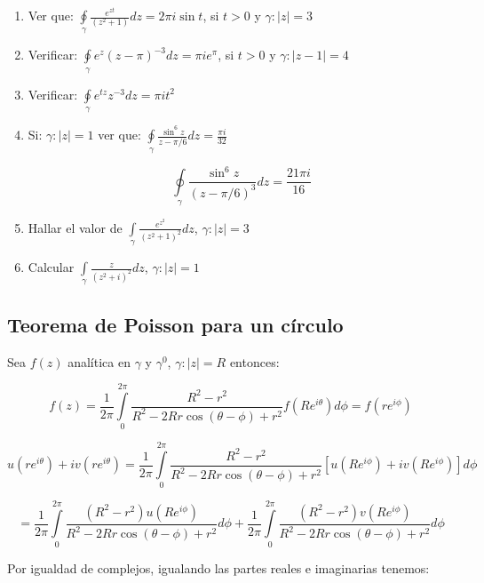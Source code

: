 \documentclass[a4paper,12pt]{article}
\begin{document}
\begin{enumerate}
    \item Ver que: $\oint\limits_{\gamma} \frac{e^{zt}}{(z^2 + 1)}dz = 2\pi i \sin t$, si $t > 0$ y $\gamma : |z| = 3$

\item Verificar: $\oint\limits_{\gamma} e^{z}(z - \pi)^{-3} dz = \pi i e^\pi$, \quad si $t > 0$ y \quad $\gamma : |z - 1| = 4$

\item Verificar: $\oint\limits_{\gamma} e^{tz} z^{-3} dz = \pi it^2$

\item Si: $\gamma : |z| = 1$ \quad ver que: $\oint\limits_{\gamma} \frac{\sin^6 z}{z - \pi / 6} dz = \frac{\pi i}{32}$

\[
\oint\limits_{\gamma} \frac{\sin^6 z}{(z - \pi / 6)^3} dz = \frac{21\pi i}{16}
\]


\item Hallar el valor de $\int\limits_{ \gamma } \frac{ e^{z^2} }{ \left( z^2 + 1 \right)^2 } dz$, $\gamma : |z| = 3$

\item Calcular $\int\limits_{ \gamma } \frac{ z }{ \left( z^2 + i \right)^2 } dz$, $\gamma : |z| = 1$
\end{enumerate}
\newpage

\subsection{Teorema de Poisson para un círculo}

Sea $f(z)$ analítica en $\gamma$ y $\gamma^0$, $\gamma : |z| = R$ entonces:

\[
f(z) = \frac{1}{2\pi} \int\limits_{0}^{2\pi} \frac{ R^2 - r^2 }{ R^2 - 2Rr \cos(\theta - \phi) + r^2 } f(Re^{i\theta}) d\phi = f(re^{i\phi})
\]

\[
u(r e^{i\theta}) + iv(re^{i\theta}) = \frac{1}{2\pi} \int\limits_{0}^{2\pi} \frac{ R^2 - r^2 }{ R^2 - 2Rr \cos(\theta - \phi) + r^2 } \left[ u(Re^{i\phi}) + iv(Re^{i\phi}) \right] d\phi
\]

\[
= \frac{1}{2\pi} \int\limits_{0}^{2\pi} \frac{ \left( R^2 - r^2 \right) u(Re^{i\phi}) }{ R^2 - 2Rr \cos(\theta - \phi) + r^2 } d\phi + \frac{1}{2\pi} \int\limits_{0}^{2\pi} \frac{ \left( R^2 - r^2 \right) v(Re^{i\phi}) }{ R^2 - 2Rr \cos(\theta - \phi) + r^2 } d\phi
\]

Por igualdad de complejos, igualando las partes reales e imaginarias tenemos:
\end{document}
